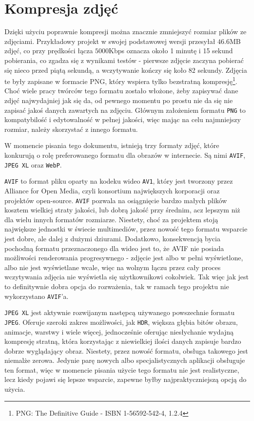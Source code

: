 \documentclass[licencjacka]{pracadypl}
\begin{document}
\section{Kompresja zdjęć}

Dzięki użyciu poprawnie kompresji można znacznie zmniejszyć rozmiar plików ze zdjęciami. Przykładowy projekt w swojej podstawowej wersji przesyłał $46.6$MB zdjęć, co przy prędkości łącza $5000$Kbps oznacza około 1 minutę i 15 sekund pobierania, co zgadza się z wynikami testów - pierwsze zdjęcie zaczyna pobierać się nieco przed piątą sekundą, a wczytywanie kończy się koło 82 sekundy. Zdjęcia te były zapisane w formacie PNG, który wspiera tylko bezstratną kompresję\footnote{PNG: The Definitive Guide - ISBN 1-56592-542-4, 1.2.4}. Choć wiele pracy twórców tego formatu zostało włożone, żeby zapisywać dane zdjęć najwydajniej jak się da, od pewnego momentu po prostu nie da się nie zapisać jakoś danych zawartych na zdjęciu. Głównym założeniem formatu \texttt{PNG} to kompatybilość i edytowalność w pełnej jakości, więc mając na celu najmniejszy rozmiar, należy skorzystać z innego formatu.

W momencie pisania tego dokumentu, istnieją trzy formaty zdjęć, które konkurują o rolę preferowanego formatu dla obrazów w internecie. Są nimi \texttt{AVIF}, \texttt{JPEG XL} oraz \texttt{WebP}. 

\texttt{AVIF} to format pliku oparty na kodeku wideo \texttt{AV1}, który jest tworzony przez Alliance for Open Media, czyli konsortium największych korporacji oraz projektów open-source. \texttt{AVIF} pozwala na osiągnięcie bardzo małych plików kosztem wielkiej straty jakości, lub dobrą jakość przy średnim, acz lepszym niż dla wielu innych formatów rozmiarze. Niestety, choć za projektem stoją największe jednostki w świecie multimediów, przez nowość tego formatu wsparcie jest dobre, ale dalej z dużymi dziurami. Dodatkowo, konsekwencją bycia pochodną formatu przeznaczonego dla wideo jest to, że AVIF nie posiada możliwości renderowania progresywnego - zdjęcie jest albo w pełni wyświetlone, albo nie jest wyświetlane wcale, więc na wolnym łączu przez cały proces wczytywania zdjęcia nie wyświetla się użytkownikowi cokolwiek. Tak więc jak jest to definitywnie dobra opcja do rozważenia, tak w ramach tego projektu nie wykorzystano \texttt{AVIF}'a.

\texttt{JPEG XL} jest aktywnie rozwijanym następcą używanego powszechnie formatu \texttt{JPEG}. Oferuje szeroki zakres możliwości, jak \texttt{HDR}, większa głębia bitów obrazu, animacje, warstwy i wiele więcej, jednocześnie oferując niesłychanie wydajną kompresję stratną, która korzystając z niewielkiej ilości danych zapisuje bardzo dobrze wyglądający obraz. Niestety, przez nowość formatu, obsługa takowego jest niemalże zerowa. Jedynie parę nowych albo specjalistycznych aplikacji obsługuje ten format, więc w momencie pisania użycie tego formatu nie jest realistyczne, lecz kiedy pojawi się lepsze wsparcie, zapewne byłby najpraktyczniejszą opcją do użycia.
\end{document}

